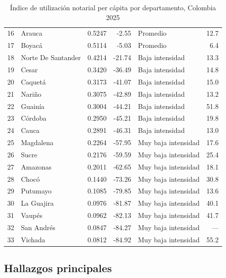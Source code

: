 \documentclass{article}
\begin{document}
\begin{table}[H]
\begin{tabular}{clrrl r}
16 & Arauca              & 0.5247 &   -2.55 & Promedio         & 12.7 \\
17 & Boyacá              & 0.5114 &   -5.03 & Promedio         &  6.4 \\
18 & Norte De Santander  & 0.4214 &  -21.74 & Baja intensidad    & 13.3 \\
19 & Cesar               & 0.3420 &  -36.49 & Baja intensidad    & 14.8 \\
20 & Caquetá             & 0.3173 &  -41.07 & Baja intensidad    & 15.0 \\
21 & Nariño              & 0.3075 &  -42.89 & Baja intensidad    & 13.2 \\
22 & Guainía             & 0.3004 &  -44.21 & Baja intensidad    & 51.8 \\
23 & Córdoba             & 0.2950 &  -45.21 & Baja intensidad    & 19.8 \\
24 & Cauca               & 0.2891 &  -46.31 & Baja intensidad    & 13.0 \\
25 & Magdalena           & 0.2264 &  -57.95 & Muy baja intensidad & 17.6 \\
26 & Sucre               & 0.2176 &  -59.59 & Muy baja intensidad & 25.4 \\
27 & Amazonas            & 0.2011 &  -62.65 & Muy baja intensidad & 18.1 \\
28 & Chocó               & 0.1440 &  -73.26 & Muy baja intensidad & 30.8 \\
29 & Putumayo            & 0.1085 &  -79.85 & Muy baja intensidad & 13.6 \\
30 & La Guajira          & 0.0976 &  -81.87 & Muy baja intensidad & 40.1 \\
31 & Vaupés              & 0.0962 &  -82.13 & Muy baja intensidad & 41.7 \\
32 & San Andrés          & 0.0847 &  -84.27 & Muy baja intensidad & --- \\
33 & Vichada             & 0.0812 &  -84.92 & Muy baja intensidad & 55.2 \\
\bottomrule
\end{tabular}
\caption{Índice de utilización notarial per cápita 
por departamento, Colombia 2025}
\end{table}



\subsection{Hallazgos principales}
\end{document}

